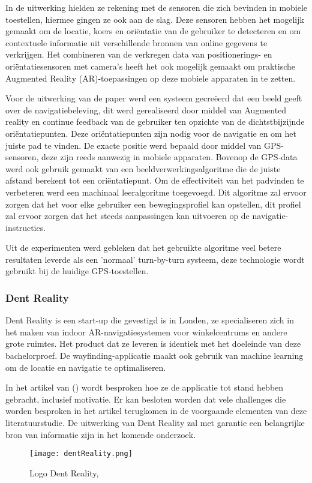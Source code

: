 In de uitwerking hielden ze rekening met de sensoren die zich bevinden in mobiele toestellen, hiermee gingen ze ook aan de slag. Deze sensoren hebben het mogelijk gemaakt om de locatie, koers en oriëntatie van de gebruiker te detecteren en om contextuele informatie uit verschillende bronnen van online gegevens te verkrijgen. Het combineren van de verkregen data van positionerings- en oriëntatiesensoren met camera's heeft het ook mogelijk gemaakt om praktische Augmented Reality (AR)-toepassingen op deze mobiele apparaten in te zetten. 

Voor de uitwerking van de paper werd een systeem gecreëerd dat een beeld geeft over de navigatiebeleving, dit werd gerealiseerd door middel van Augmented reality en continue feedback van de gebruiker ten opzichte van de dichtstbijzijnde oriëntatiepunten. Deze oriëntatiepunten zijn nodig voor de navigatie en om het juiste pad te vinden. De exacte positie werd bepaald door middel van GPS-sensoren, deze zijn reeds aanwezig in mobiele apparaten. Bovenop de GPS-data werd ook gebruik gemaakt van een beeldverwerkingsalgoritme die de juiste afstand berekent tot een oriëntatiepunt. Om de effectiviteit van het padvinden te verbeteren werd een machinaal leeralgoritme toegevoegd. Dit algoritme zal ervoor zorgen dat het voor elke gebruiker een bewegingsprofiel kan opstellen, dit profiel zal ervoor zorgen dat het steeds aanpassingen kan uitvoeren op de navigatie-instructies.

Uit de experimenten werd gebleken dat het gebruikte algoritme veel betere resultaten leverde als een 'normaal' turn-by-turn systeem, deze technologie wordt gebruikt bij de huidige GPS-toestellen.

\subsubsection{Dent Reality}
Dent Reality is een start-up die gevestigd is in Londen, ze specialiseren zich in het maken van indoor AR-navigatiesystemen voor winkelcentrums en andere grote ruimtes. Het product dat ze leveren is identiek met het doeleinde van deze bachelorproef. De wayfinding-applicatie maakt ook gebruik van machine learning om de locatie en navigatie te optimaliseren.

In het artikel van \textcite{Hart2019} () wordt besproken hoe ze de applicatie tot stand hebben gebracht, inclusief motivatie. Er kan besloten worden dat vele challenges die worden besproken in het artikel terugkomen in de voorgaande elementen van deze literatuurstudie. De uitwerking van Dent Reality zal met garantie een belangrijke bron van informatie zijn in het komende onderzoek.

\begin{figure}[H]
	\centering
	\texttt{[image: dentReality.png]}
	\caption{Logo Dent Reality, \autocite{Hart2019}}
\end{figure}

